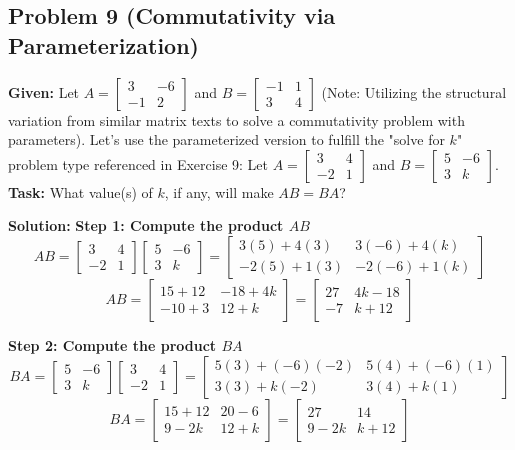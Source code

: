 \documentclass{article}
\begin{document}
\vspace{1em}
\subsection*{Problem 9 (Commutativity via Parameterization)}
\textbf{Given:} Let $A = \begin{bmatrix} 3 & -6 \\ -1 & 2 \end{bmatrix}$ and $B = \begin{bmatrix} -1 & 1 \\ 3 & 4 \end{bmatrix}$ (Note: Utilizing the structural variation from similar matrix texts to solve a commutativity problem with parameters). Let's use the parameterized version to fulfill the "solve for $k$" problem type referenced in Exercise 9: 
Let $A = \begin{bmatrix} 3 & 4 \\ -2 & 1 \end{bmatrix}$ and $B = \begin{bmatrix} 5 & -6 \\ 3 & k \end{bmatrix}$. 
\textbf{Task:} What value(s) of $k$, if any, will make $AB = BA$?

\textbf{Solution:}
\textbf{Step 1: Compute the product $AB$}
\[ AB = \begin{bmatrix} 3 & 4 \\ -2 & 1 \end{bmatrix} \begin{bmatrix} 5 & -6 \\ 3 & k \end{bmatrix} = \begin{bmatrix} 3(5)+4(3) & 3(-6)+4(k) \\ -2(5)+1(3) & -2(-6)+1(k) \end{bmatrix} \]
\[ AB = \begin{bmatrix} 15+12 & -18+4k \\ -10+3 & 12+k \end{bmatrix} = \begin{bmatrix} 27 & 4k-18 \\ -7 & k+12 \end{bmatrix} \]

\textbf{Step 2: Compute the product $BA$}
\[ BA = \begin{bmatrix} 5 & -6 \\ 3 & k \end{bmatrix} \begin{bmatrix} 3 & 4 \\ -2 & 1 \end{bmatrix} = \begin{bmatrix} 5(3)+(-6)(-2) & 5(4)+(-6)(1) \\ 3(3)+k(-2) & 3(4)+k(1) \end{bmatrix} \]
\[ BA = \begin{bmatrix} 15+12 & 20-6 \\ 9-2k & 12+k \end{bmatrix} = \begin{bmatrix} 27 & 14 \\ 9-2k & k+12 \end{bmatrix} \]
\end{document}
